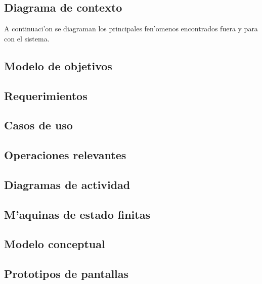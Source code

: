 \subsection{Diagrama de contexto}
A continuaci'on se diagraman los principales fen'omenos encontrados fuera y para con el sistema.

\subsection{Modelo de objetivos}


\subsection{Requerimientos}



\subsection{Casos de uso}


\subsection{Operaciones relevantes}
\subsection{Diagramas de actividad}
\subsection{M'aquinas de estado finitas}
\subsection{Modelo conceptual}
\subsection{Prototipos de pantallas}
